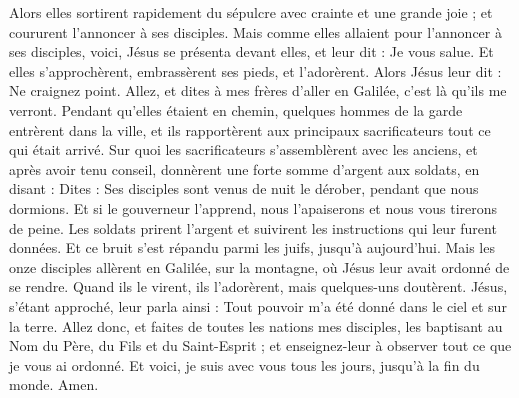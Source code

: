 \begin{multicols}{2}
Alors elles sortirent rapidement du sépulcre avec crainte et une grande joie ; et coururent l'annoncer à ses disciples.
Mais comme elles allaient pour l'annoncer à ses disciples, voici, Jésus se présenta devant elles, et leur dit : Je vous salue. Et elles s'approchèrent, embrassèrent ses pieds, et l'adorèrent.
Alors Jésus leur dit : Ne craignez point. Allez, et dites à mes frères d'aller en Galilée, c’est là qu'ils me verront.
Pendant qu’elles étaient en chemin, quelques hommes de la garde entrèrent dans la ville, et ils rapportèrent aux principaux sacrificateurs tout ce qui était arrivé.
Sur quoi les sacrificateurs s'assemblèrent avec les anciens, et après avoir tenu conseil, donnèrent une forte somme d'argent aux soldats,
en disant : Dites : Ses disciples sont venus de nuit le dérober, pendant que nous dormions.
Et si le gouverneur l’apprend, nous l’apaiserons et nous vous tirerons de peine.
Les soldats prirent l'argent et suivirent les instructions qui leur furent données. Et ce bruit s’est répandu parmi les juifs, jusqu’à aujourd’hui.
Mais les onze disciples allèrent en Galilée, sur la montagne, où Jésus leur avait ordonné de se rendre.
Quand ils le virent, ils l'adorèrent, mais quelques-uns doutèrent.
Jésus, s’étant approché, leur parla ainsi : Tout pouvoir m’a été donné dans le ciel et sur la terre.
Allez donc, et faites de toutes les nations mes disciples, les baptisant au Nom du Père, du Fils et du Saint-Esprit ;
et enseignez-leur à observer tout ce que je vous ai ordonné. Et voici, je suis avec vous tous les jours, jusqu’à la fin du monde. Amen.
\PPE{}
\end{multicols}
